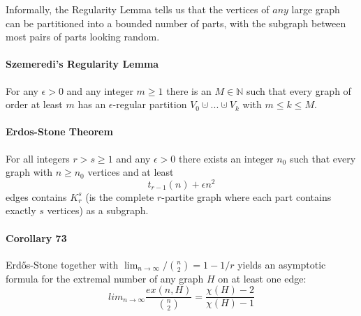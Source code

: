 \bigskip \noindent
Informally, the Regularity Lemma tells us that the vertices of $ any $ large 
graph can be partitioned into a bounded number of parts, with the subgraph 
between most pairs of parts looking random.

\paragraph{Szemeredi's Regularity Lemma} For any $\epsilon > 0 $ and any 
integer $ m \geq 1 $ there is an $ M \in \mathbb{N} $ such that every graph 
of order at least $ m $ has an $\epsilon$-regular partition 
$V_0 \cupdot...\cupdot V_k$ with $ m\leq k \leq M $.

\paragraph{Erdos-Stone Theorem} For all integers $ r > s \geq 1 $ and any 
$ \epsilon > 0 $ there exists an integer $ n_0 $ such that every graph with 
$n \geq n_0$ vertices and at least
$$ t_{r-1}(n) + \epsilon n^2 $$
edges contains $ K^s_r $ (is the complete $r$-partite graph where each 
part contains exactly $ s $ vertices) as a subgraph.

\paragraph{Corollary 73} Erd\H{o}s-Stone together with 
$ \lim_{n\to\infty} / \binom{n}{2} = 1 - 1 / r $ yields an asymptotic formula 
for the extremal number of any graph $ H $ on at least one edge:
$$ lim_{n\to\infty} \frac{ex(n,H)}{\binom{n}{2}} = \frac{\chi(H)-2}{\chi(H)-1} $$


